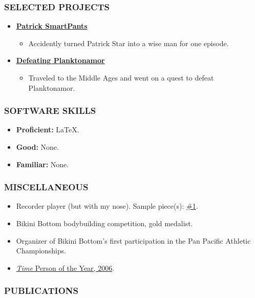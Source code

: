 \documentclass[11pt]{article}
\begin{document}
\subsubsection*{SELECTED PROJECTS}
\begin{itemize}
    \item \href{https://spongebob.fandom.com/wiki/Patrick_SmartPants}{\textbf{Patrick SmartPants}} \begin{itemize}
        \item Accidently turned Patrick Star into a wise man for one episode.
    \end{itemize}
    \item \href{https://spongebob.fandom.com/wiki/Dunces_and_Dragons}{\textbf{Defeating Planktonamor}} \begin{itemize}
        \item Traveled to the Middle Ages and went on a quest to defeat Planktonamor. 
    \end{itemize}
\end{itemize}

\subsubsection*{SOFTWARE SKILLS}
\begin{itemize}
    \item \textbf{Proficient:} \LaTeX.
    \item \textbf{Good:} None.
    \item \textbf{Familiar:} None.
\end{itemize}

\subsubsection*{MISCELLANEOUS}
\begin{itemize}
    \item Recorder player (but with my nose). Sample piece(s): \href{https://youtu.be/r9L4AseD-aA?t=37}{\#1}.
    \item Bikini Bottom bodybuilding competition, gold medalist.
    \item Organizer of Bikini Bottom's first participation in the Pan Pacific Athletic Championships.
    \item \href{https://en.wikipedia.org/wiki/You_(Time_Person_of_the_Year)}{\textit{Time} Person of the Year, 2006}.
\end{itemize}

\subsubsection*{PUBLICATIONS}
\printbibliography[heading=none]
\end{document}
